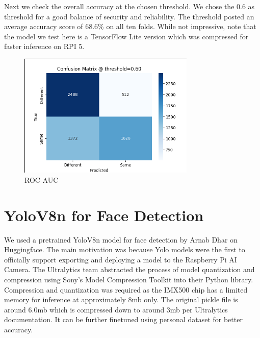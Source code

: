 \clearpage
Next we check the overall accuracy at the chosen threshold. We chose the 0.6 as threshold for a good balance of security and reliability. The threshold posted an average accuracy score of 68.6\% on all ten folds. While not impressive, note that the model we test here is a TensorFlow Lite version which was compressed for faster inference on RPI 5.
\begin{figure}[h] %
	\centering
	\includegraphics[width=0.75\textwidth]{figures/chapter4/fixed_thresh_matrix.png} %
	\caption{ROC AUC}
	\label{fig:fixed_thresh}
\end{figure}



\section{YoloV8n for Face Detection}
We used a pretrained YoloV8n model for face detection by Arnab Dhar on Huggingface. The main motivation was because Yolo models were the first to officially support exporting and deploying a model to the Raspberry Pi AI Camera. The Ultralytics team abstracted the process of model quantization and compression using Sony's Model Compression Toolkit into their Python library. Compression and quantization was required as the IMX500 chip has a limited memory for inference at approximately 8mb only. The original pickle file is around 6.0mb which is compressed down to around 3mb per Ultralytics documentation. It can be further finetuned using personal dataset for better accuracy. 





